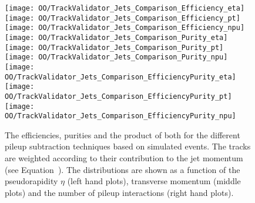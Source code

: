 \begin{figure}[Ht]
  \centering
  \texttt{[image: OO/TrackValidator\_Jets\_Comparison\_Efficiency\_eta]}
  \texttt{[image: OO/TrackValidator\_Jets\_Comparison\_Efficiency\_pt]}
  \texttt{[image: OO/TrackValidator\_Jets\_Comparison\_Efficiency\_npu]}
  \\
  \texttt{[image: OO/TrackValidator\_Jets\_Comparison\_Purity\_eta]}
  \texttt{[image: OO/TrackValidator\_Jets\_Comparison\_Purity\_pt]}
  \texttt{[image: OO/TrackValidator\_Jets\_Comparison\_Purity\_npu]}
  \\
  \texttt{[image: OO/TrackValidator\_Jets\_Comparison\_EfficiencyPurity\_eta]}
  \texttt{[image: OO/TrackValidator\_Jets\_Comparison\_EfficiencyPurity\_pt]}
  \texttt{[image: OO/TrackValidator\_Jets\_Comparison\_EfficiencyPurity\_npu]}
  \caption[Efficiencies, purities and their product of the different pileup subtraction techniques based on simulated \ttbar events with jet weight]{The efficiencies, purities and the product of both for the different pileup subtraction techniques based on simulated \ttbar events. The tracks are weighted according to their contribution to the jet momentum (see Equation~). The distributions are shown as a function of the pseudorapidity $\eta$ (left hand plots), transverse momentum (middle plots) and the number of pileup interactions (right hand plots). \label{plot:OOJetsTVCompTTSignal}}
\end{figure}

